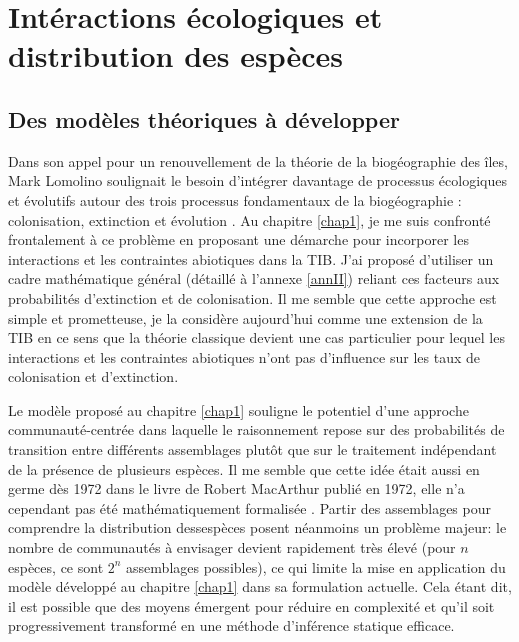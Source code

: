 \section*{Intéractions écologiques et distribution des
espèces}\label{intuxe9ractions-uxe9cologiques-et-distribution-des-espuxe8ces}

\subsection*{Des modèles théoriques à
développer}\label{des-moduxe8les-thuxe9oriques-uxe0-duxe9velopper}

Dans son appel pour un renouvellement de la théorie de la biogéographie
des îles, Mark Lomolino soulignait le besoin d'intégrer davantage de
processus écologiques et évolutifs autour des trois processus
fondamentaux de la biogéographie : colonisation, extinction et évolution
\citep{Lomolino2000}. Au chapitre \ref{chap1}, je me suis confronté
frontalement à ce problème en proposant une démarche pour incorporer les
interactions et les contraintes abiotiques dans la TIB. J'ai proposé
d'utiliser un cadre mathématique général (détaillé à l'annexe
\ref{annII}) reliant ces facteurs aux probabilités d'extinction et de
colonisation. Il me semble que cette approche est simple et prometteuse,
je la considère aujourd'hui comme une extension de la TIB en ce sens que
la théorie classique devient une cas particulier pour lequel les
interactions et les contraintes abiotiques n'ont pas d'influence sur les
taux de colonisation et d'extinction.

Le modèle proposé au chapitre \ref{chap1} souligne le potentiel d'une
approche communauté-centrée dans laquelle le raisonnement repose sur des
probabilités de transition entre différents assemblages
\citep{Cazelles2015a} plutôt que sur le traitement indépendant de la
présence de plusieurs espèces. Il me semble que cette idée était aussi
en germe dès 1972 dans le livre de Robert MacArthur publié en 1972, elle
n'a cependant pas été mathématiquement formalisée
\citep{macarthur1972geographical}. Partir des assemblages pour
comprendre la distribution dessespèces posent néanmoins un problème
majeur: le nombre de communautés à envisager devient rapidement très
élevé (pour \(n\) espèces, ce sont \(2^n\) assemblages possibles), ce
qui limite la mise en application du modèle développé au chapitre
\ref{chap1} dans sa formulation actuelle. Cela étant dit, il est
possible que des moyens émergent pour réduire en complexité et qu'il
soit progressivement transformé en une méthode d'inférence statique
efficace.

